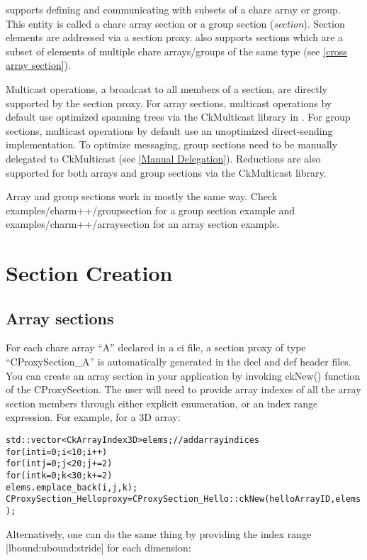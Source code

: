 \charmpp{} supports defining and communicating with subsets of a chare
array or group.  This entity is called a chare array section or a group section (\emph{section}).
Section elements are addressed via a section proxy.
\charmpp{} also supports sections which are a subset of elements of
multiple chare arrays/groups of the same type (see \ref{cross array section}).

Multicast operations, a broadcast to all members of a section, are directly
supported by the section proxy. For array sections, multicast operations by default
use optimized spanning trees via the CkMulticast library in \charmpp{}.
For group sections, multicast operations by default use an unoptimized
direct-sending implementation.
To optimize messaging, group sections need to be manually delegated to CkMulticast
(see \ref{Manual Delegation}).
Reductions are also supported for both arrays and group sections via the CkMulticast library.

Array and group sections work in mostly the same way.
Check examples/charm++/groupsection for a group section example and
examples/charm++/arraysection for an array section example.

\section{Section Creation}
\label{section creation}

\subsection{Array sections}

For each chare array ``A'' declared in a ci file, a section proxy
of type ``CProxySection\_A'' is automatically generated in the decl and def
header files.
You can create an array section in your application by invoking ckNew() function of the CProxySection.
The user will need to provide array indexes
of all the array section members through either explicit enumeration, or an index range expression.
For example, for a 3D array:

\begin{alltt}
  std::vector<CkArrayIndex3D> elems;  // add array indices
  for (int i=0; i<10; i++)
    for (int j=0; j<20; j+=2)
      for (int k=0; k<30; k+=2)
         elems.emplace_back(i, j, k);
  CProxySection_Hello proxy = CProxySection_Hello::ckNew(helloArrayID, elems);
\end{alltt}

Alternatively, one can do the same thing by providing the index range [lbound:ubound:stride]
for each dimension:

